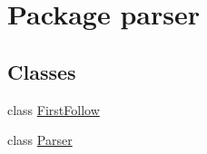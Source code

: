 \hypertarget{namespaceparser}{}\section{Package parser}
\label{namespaceparser}
\subsection*{Classes}
\begin{DoxyCompactItemize}
\item 
class \hyperlink{classparser_1_1FirstFollow}{First\+Follow}
\item 
class \hyperlink{classparser_1_1Parser}{Parser}
\end{DoxyCompactItemize}
